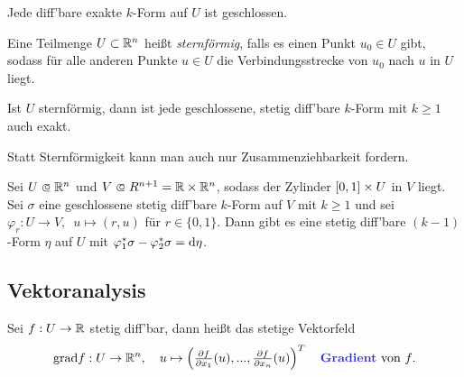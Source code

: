 \documentclass{cheat-sheet}
\newcommand{\grad}{\mathrm{grad}} %
\theoremstyle{definition}
\begin{document}
\begin{beobachtung}
  Jede diff'bare exakte $k$-Form auf $U$ ist geschlossen.
\end{beobachtung}


\begin{defn}
  Eine Teilmenge $U \subset \mathbb{R}^n$ heißt \emph{sternförmig}, falls es einen Punkt $u_0 \in U$ gibt, sodass für alle anderen Punkte $u \in U$ die Verbindungsstrecke von $u_0$ nach $u$ in $U$ liegt.
\end{defn}

\begin{lem}[Poincaré]
  Ist $U$ sternförmig, dann ist jede geschlossene, stetig diff'bare $k$-Form mit $k \geq 1$ auch exakt.
\end{lem}

\begin{bem}
  Statt Sternförmigkeit kann man auch nur Zusammenziehbarkeit fordern.
\end{bem}


\begin{samepage}

\begin{lem}
  Sei $U \opn \R^n$ und $V \opn R^{n{+}1} = \R \times \R^n$, sodass der Zylinder $\left[ 0, 1 \right] \times U$ in $V$ liegt. Sei $\sigma$ eine geschlossene stetig diff'bare $k$-Form auf $V$ mit $k \geq 1$ und sei $\varphi_r : U \to V, \enspace u \mapsto (r, u)$ für $r \in \{ 0, 1 \}$.
  Dann gibt es eine stetig diff'bare $(k{-}1)$-Form $\eta$ auf $U$ mit $\varphi_1^* \sigma - \varphi_2^* \sigma = \mathrm{d} \eta$.
\end{lem}


\subsection{Vektoranalysis}

\end{samepage}


\begin{defn}
  Sei $f : U \to \mathbb{R}$ stetig diff'bar, dann heißt das stetige Vektorfeld
  \[
    \grad f : U \to \R^n, \quad
    u \mapsto \left( \tfrac{\partial f}{\partial x_1} (u), ..., \tfrac{\partial f}{\partial x_n} (u) \right)^T
    \quad \text{\emph{Gradient} von $f$.}
  \]
\end{defn}
\end{document}
